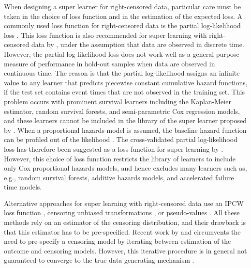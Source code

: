 \documentclass[alpha-refs]{wiley-article}
\newcommand{\1}{\mathds{1}}
\begin{document}
When designing a super learner for right-censored data, particular
care must be taken in the choice of loss function and in the
estimation of the expected loss. A commonly used loss function for
right-censored data is the partial log-likelihood loss
\citep[e.g.,][]{li2016regularized,yao2017deep,lee2018deephit,katzman2018deepsurv,gensheimer2019scalable,lee2021boosted,kvamme2021continuous}.
This loss function is also recommended for super learning with
right-censored data by \cite{polley2011-sl-cens}, under the assumption
that data are observed in discrete time. However, the partial
log-likelihood loss does not work well as a general purpose measure of
performance in hold-out samples when data are observed in continuous
time. The reason is that the partial log-likelihood assigns an
infinite value to any learner that predicts piecewise constant
cumulative hazard functions, if the test set contains event times that
are not observed in the training set. This problem occurs with
prominent survival learners including the Kaplan-Meier estimator,
random survival forests, and semi-parametric Cox regression models,
and these learners cannot be included in the library of the super
learner proposed by \cite{polley2011-sl-cens}. When a proportional
hazards model is assumed, the baseline hazard function can be profiled
out of the likelihood \citep{cox1972regression}. The cross-validated
partial log-likelihood loss \citep{verweij1993cross} has therefore
been suggested as a loss function for super learning by
\cite{golmakani2020super}. However, this choice of loss function
restricts the library of learners to include only Cox proportional
hazards models, and hence excludes many learners such as, e.g., random
survival forests, additive hazards models, and accelerated failure
time models.

Alternative approaches for super learning with right-censored data use
an IPCW loss function
\citep{graf1999assessment,van2003unicv,molinaro2004tree,keles2004asymptotically,hothorn2006survival,gerds2006consistent,gonzalez2021stacked},
censoring unbiased transformations
\citep{fan1996local,steingrimsson2019censoring}, or pseudo-values
\citep{andersen2003generalised,mogensen2013random,sachs2019ensemble}.
All these methods rely on an estimator of the censoring distribution,
and their drawback is that this estimator has to be pre-specified.
Recent work by \cite{han2021inverse} and \cite{westling2021inference}
circumvents the need to pre-specify a censoring model by iterating
between estimation of the outcome and censoring models. However, this
iterative procedure is in general not guaranteed to converge to the
true data-generating mechanism
\citep[][Appendix~A.4]{munch2024thesis}.
\end{document}
